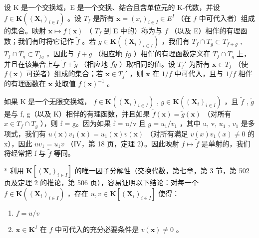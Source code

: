 设 K 是一个交换域，E 是一个交换、结合且含单位元的 K-代数，并设 \(f \in \mathbf{K}((\mathbf{X}_i)_{i \in I})\) 。设 \(T_f\) 是所有 \(\mathbf{x} = (x_i)_{i \in I} \in E^{I}\) （在 \(f\) 中可代入者）组成的集合。映射 \(\mathbf{x} \mapsto f(\mathbf{x})\) （ \(T_f\) 到 E 中的）称为与 \(f\) （以及 E）相伴的有理函数；我们有时将它记作 \(\tilde{f}\) 。若 \(g \in \mathbf{K}((\mathbf{X}_i)_{i \in I})\) ，我们有 \(T_f \cap T_g \subset T_{f + g}\) , \(T_f \cap T_g \subset T_{fg}\) ，因此与 \(f + g\) （相应地 \(fg\) ）相伴的有理函数定义在 \(T_f \cap T_g\) 上，并且在该集合上与 \(\tilde{f} + \tilde{g}\) （相应地 \(\tilde{f}\tilde{g}\) ）取相同的值。设 \(T_f'\) 为所有 \(\mathbf{x} \in T_f\) （使 \(f(\mathbf{x})\) 可逆者）组成的集合；若 \(\mathbf{x} \in T_f'\) ，则 \(\mathbf{x}\) 在 \(1/f\) 中可代入，且与 \(1/f\) 相伴的有理函数在 \(\mathbf{x}\) 处取值 \(f(\mathbf{x})^{-1}\) 。

如果 K 是一个无限交换域， \(f \in \mathbf{K}((\mathbf{X}_i)_{i \in I})\) , \(g \in \mathbf{K}((\mathbf{X}_i)_{i \in I})\) ，且 \(\tilde{f}\) , \(\tilde{g}\) 是与 f, g（以及 K）相伴的有理函数，并且如果 \(\tilde{f}(\mathbf{x}) = \tilde{g}(\mathbf{x})\) （对所有 \(x \in T_f \cap T_g\) ），则 f = g。因为如果 f = u/v 且 \(g = u_1 / v_1\) ，其中 u, v, \(u_1\) , \(v_1\) 是多项式，我们有 \(u(\mathbf{x})v_1(\mathbf{x}) = u_1(\mathbf{x})v(\mathbf{x})\) （对所有满足 \(v(x)v_1(x) \neq 0\) 的 x），因此 \(uv_1 = u_1v\) （IV，第 18 页，定理 2）。因此映射 \(f \mapsto \tilde{f}\) 是单射的，我们将经常把 f 与 \(\tilde{f}\) 等同。

* 利用 \(\mathbf{K}[(\mathbf{X}_i)_{i\in I}]\) 的唯一因子分解性（交换代数，第七章，第 3 节，第 502 页及定理 2 的推论，第 506 页），容易证明以下结论：对每一个 \(f\in \mathbf{K}((\mathbf{X}_i)_{i\in I})\) ，存在 \(u,v\in \mathbf{K}[(\mathbf{X}_i)_{i\in I}]\) 使得：

\begin{enumerate}
\def\labelenumi{\arabic{enumi})}
\item
  \(f = u / v\)
\item
  \(\mathbf{x} \in \mathbf{K}^{I}\) 在 \(f\) 中可代入的充分必要条件是 \(v(\mathbf{x}) \neq 0\) 。
\end{enumerate}

